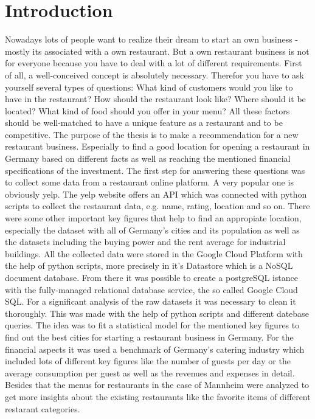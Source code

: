 \section{Introduction}
\label{sec:introduction}
Nowadays lots of people want to realize their dream to start an own business - mostly its associated with a own restaurant. But a own restaurant business is not for everyone because you have to deal with a lot of different requirements. First of all, a well-conceived concept is absolutely necessary. Therefor you have to ask yourself several types of questions: What kind of customers would you like to have in the restaurant? How should the restaurant look like? Where should it be located? What kind of food should you offer in your menu? All these factors should be well-matched to have a unique feature as a restaurant and to be competitive.   
The purpose of the thesis is to make a recommendation for a new restaurant business. Especially to find a good location for opening a restaurant in Germany based on different facts as well as reaching the mentioned financial specifications of the investment.
The first step for answering these questions was to collect some data from a restaurant online platform. A very popular one is obviously yelp. The yelp website offers an API which was connected with python scripts to collect the restaurant data, e.g. name, rating, location and so on. There were some other important key figures that help to find an appropiate location, especially the dataset with all of Germany's cities and its population as well as the datasets including the buying power and the rent average for industrial buildings. All the collected data were stored in the Google Cloud Platform with the help of python scripts, more precisely in it's Datastore which is a NoSQL document database. From there it was possible to create a postgreSQL istance with the fully-managed relational database service, the so called Google Cloud SQL. For a significant analysis of the raw datasets it was necessary to clean it thoroughly. This was made with the help of python scripts and different datebase queries. The idea was to fit a statistical model for the mentioned key figures to find out the best cities for starting a restaurant business in Germany. For the financial aspects it was used a benchmark of Germany's catering industry which included lots of different key figures like the number of guests per day or the average consumption per guest as well as the revenues and expenses in detail. Besides that the menus for restaurants in the case of Mannheim were analyzed to get more insights about the existing restaurants like the favorite items of different restarant categories.


